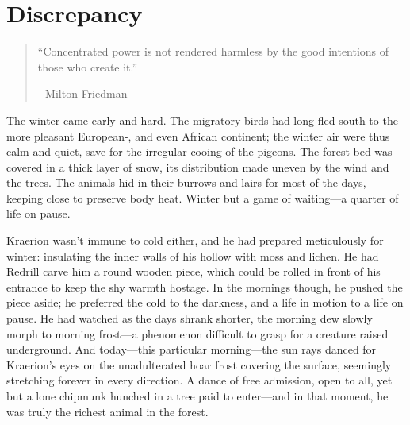 \chapter{Discrepancy}

\vspace{-1.3cm}
\begin{localsize}{10}
	\begin{quote}
	“Concentrated power is not rendered harmless by the good intentions of those who create it.” 
		\begin{flushright}- Milton Friedman \end{flushright}
	\end{quote} 
\end{localsize}
\vspace{1cm}

The winter came early and hard. The migratory birds had long fled south to the more pleasant European-, and even African continent; the winter air were thus calm and quiet, save for the irregular cooing of the pigeons. The forest bed was covered in a thick layer of snow, its distribution made uneven by the wind and the trees. The animals hid in their burrows and lairs for most of the days, keeping close to preserve body heat. Winter but a game of waiting---a quarter of life on pause.

Kraerion wasn't immune to cold either, and he had prepared meticulously for winter: insulating the inner walls of his hollow with moss and lichen. He had Redrill carve him a round wooden piece, which could be rolled in front of his entrance to keep the shy warmth hostage. In the mornings though, he pushed the piece aside; he preferred the cold to the darkness, and a life in motion to a life on pause. He had watched as the days shrank shorter, the morning dew slowly morph to morning frost---a phenomenon difficult to grasp for a creature raised underground. And today---this particular morning---the sun rays danced for Kraerion's eyes on the unadulterated hoar frost covering the surface, seemingly stretching forever  in every direction. A dance of free admission, open to all, yet but a lone chipmunk hunched in a tree paid to enter---and in that moment, he was truly the richest animal in the forest.



